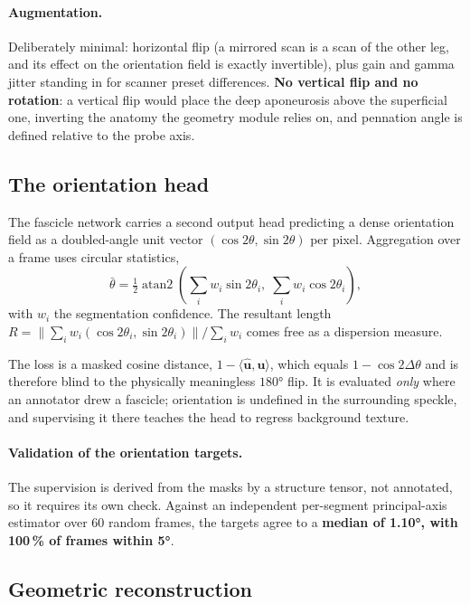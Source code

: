 \documentclass[11pt,a4paper]{article}
\begin{document}
\paragraph{Augmentation.} Deliberately minimal: horizontal flip (a mirrored
scan is a scan of the other leg, and its effect on the orientation field is
exactly invertible), plus gain and gamma jitter standing in for scanner preset
differences. \textbf{No vertical flip and no rotation}: a vertical flip would
place the deep aponeurosis above the superficial one, inverting the anatomy the
geometry module relies on, and pennation angle is defined relative to the probe
axis.

\subsection{The orientation head}
\label{sec:orientation}

The fascicle network carries a second output head predicting a dense orientation
field as a doubled-angle unit vector $(\cos 2\theta, \sin 2\theta)$ per pixel.
Aggregation over a frame uses circular statistics,
\begin{equation}
\bar\theta = \tfrac12 \operatorname{atan2}\!
  \left( \sum_i w_i \sin 2\theta_i,\; \sum_i w_i \cos 2\theta_i \right),
\label{eq:circmean}
\end{equation}
with $w_i$ the segmentation confidence. The resultant length
$R=\lVert \sum_i w_i (\cos 2\theta_i, \sin 2\theta_i) \rVert / \sum_i w_i$
comes free as a dispersion measure.

The loss is a masked cosine distance, $1-\langle \hat{\mathbf{u}},
\mathbf{u}\rangle$, which equals $1-\cos 2\Delta\theta$ and is therefore blind to
the physically meaningless $\ang{180}$ flip. It is evaluated \emph{only} where an
annotator drew a fascicle; orientation is undefined in the surrounding speckle,
and supervising it there teaches the head to regress background texture.

\paragraph{Validation of the orientation targets.} The supervision is derived from the
masks by a structure tensor, not annotated, so it requires its own check. Against
an independent per-segment principal-axis estimator over 60 random frames, the
targets agree to a \textbf{median of \ang{1.10}, with 100\,\% of frames within
\ang{5}}.

\subsection{Geometric reconstruction}
\label{sec:geometry}
\end{document}

